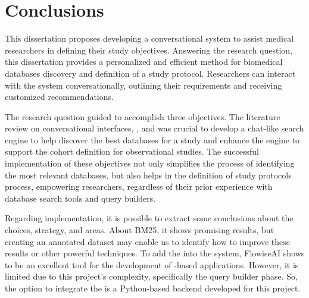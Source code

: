 \chapter{Conclusions}
\label{chapter:Conclusions}





This dissertation proposes developing a conversational system to assist medical researchers in defining their study objectives. Answering the research question, this dissertation provides a personalized and efficient method for biomedical databases discovery and definition of a study protocol. Researchers can interact with the system conversationally, outlining their requirements and receiving customized recommendations.

The research question guided to accomplish three objectives. The literature review on conversational interfaces, {\nlp}, and {\ir} was crucial to develop a chat-like search engine to help discover the best databases for a study and enhance the engine to support the cohort definition for observational studies. The successful implementation of these objectives not only simplifies the process of identifying the most relevant databases, but also helps in the definition of study protocols process, empowering researchers, regardless of their prior experience with database search tools and query builders.

Regarding implementation, it is possible to extract some conclusions about the choices, strategy, and areas. About BM25, it shows promising results, but creating an annotated dataset may enable us to identify how to improve these results or other powerful {\ir} techniques. To add the {\llm} into the system, FlowiseAI shows to be an excellent tool for the development of {\llm}-based applications. However, it is limited due to this project's complexity, specifically the query builder phase. So, the option to integrate the {\llm} is a Python-based backend developed for this project.

